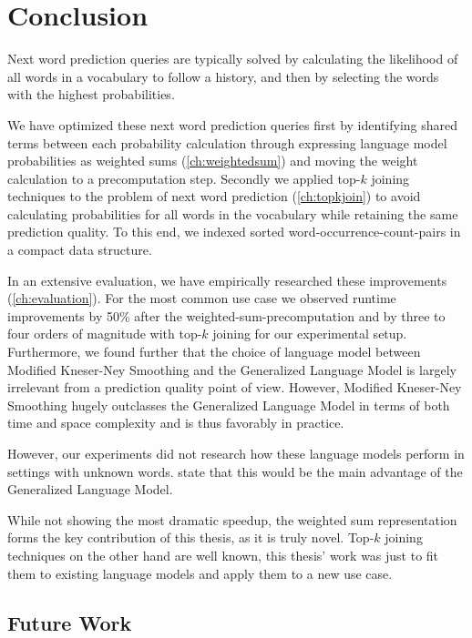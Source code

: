 \chapter{Conclusion}
\label{ch:conclusion}

Next word prediction queries are typically solved by calculating the likelihood
of all words in a vocabulary to follow a history, and then by selecting the
words with the highest probabilities.

We have optimized these next word prediction queries first by identifying
shared terms between each probability calculation through expressing language
model probabilities as weighted sums (\cref{ch:weightedsum}) and moving the
weight calculation to a precomputation step.
Secondly we applied top-$k$ joining techniques to the problem of next word
prediction (\cref{ch:topkjoin}) to avoid calculating probabilities for all words
in the vocabulary while retaining the same prediction quality.
To this end, we indexed sorted word-occurrence-count-pairs in a compact data
structure.

In an extensive evaluation, we have empirically researched these improvements
(\cref{ch:evaluation}).
For the most common use case we observed runtime improvements by 50\% after the
weighted-sum-pre\-com\-pu\-ta\-tion and by three to four orders of magnitude
with top-$k$ joining for our experimental setup.
Furthermore, we found further that the choice of language model between Modified
Kneser-Ney Smoothing and the Generalized Language Model is largely irrelevant
from a prediction quality point of view.
However, Modified Kneser-Ney Smoothing hugely outclasses the Generalized
Language Model in terms of both time and space complexity and is thus favorably
in practice.

However, our experiments did not research how these language models perform in
settings with unknown words.
\textcite{Pickhardt2014} state that this would be the main advantage of the
Generalized Language Model.

While not showing the most dramatic speedup, the weighted sum representation
forms the key contribution of this thesis, as it is truly novel.
Top-$k$ joining techniques on the other hand are well known, this thesis' work
was just to fit them to existing language models and apply them to a new use
case.

\section{Future Work}

